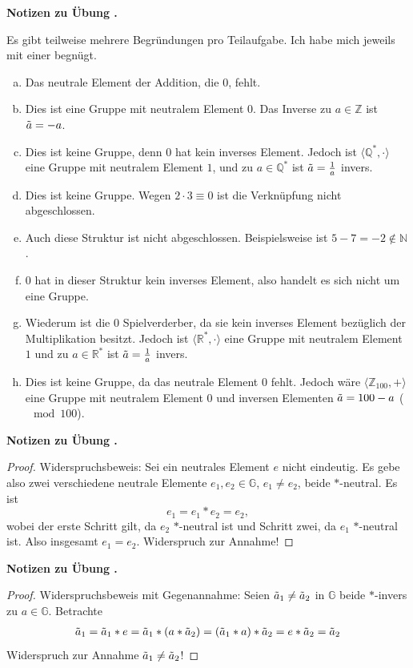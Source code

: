 \documentclass[%
11pt,%
twoside,%
titlepage,%
swissgerman,%
headsepline%
]{scrartcl}
\newcommand{\faReturnGray}{\textcolor{gray}{\faMailReply}} %
\theoremstyle{definition}
\theoremstyle{plain}
\newcommand{\concatueb}[1]{ueb:#1}%
\newcommand{\concatlsg}[1]{lsg:#1}%
\newcounter{uebcounter}[section]
\renewcommand{\theuebcounter}{\thesection.\arabic{uebcounter}}  %
\newenvironment{lsg}[1]{%
    \par\noindent\textbf{Notizen zu Übung \theuebcounter\label{\concatlsg{#1}}}
    \hfill\hyperref[\concatueb{#1}]{\faReturnGray}\par %
}{%
    \par%
}
\begin{document}
\begin{lsg}{gruppencheck}
    Es gibt teilweise mehrere Begründungen pro Teilaufgabe. Ich habe mich jeweils mit einer begnügt.
    \begin{enumerate}[a)]
        \item Das neutrale Element der Addition, die $0$, fehlt.
        \item Dies ist eine Gruppe mit neutralem Element $0$. Das Inverse zu $a\in\mathbb{Z}$ ist $\Tilde{a}=-a$.
        \item Dies ist keine Gruppe, denn $0$ hat kein inverses Element. Jedoch ist $\langle\mathbb{Q}^*,\cdot\rangle$ eine Gruppe mit neutralem Element $1$, und zu $a\in\mathbb{Q}^*$ ist $\Tilde{a}=\frac{1}{a}$ invers.
        \item Dies ist keine Gruppe. Wegen $2\cdot3\equiv0$ ist die Verknüpfung nicht abgeschlossen.
        \item Auch diese Struktur ist nicht abgeschlossen. Beispielsweise ist $5-7=-2\not\in\mathbb{N}$.
        \item $0$ hat in dieser Struktur kein inverses Element, also handelt es sich nicht um eine Gruppe.
        \item Wiederum ist die $0$ Spielverderber, da sie kein inverses Element bezüglich der Multiplikation besitzt. Jedoch ist $\langle\mathbb{R}^*,\cdot\rangle$ eine Gruppe mit neutralem Element $1$ und zu $a\in\mathbb{R}^*$ ist $\Tilde{a}=\frac{1}{a}$ invers.
        \item Dies ist keine Gruppe, da das neutrale Element $0$ fehlt. Jedoch wäre $\langle\mathbb{Z}_{100},+\rangle$ eine Gruppe mit neutralem Element $0$ und inversen Elementen $\Tilde{a}=100-a$ ($\mod100$).
    \end{enumerate}
\end{lsg}
\begin{lsg}{neutrales}
    \begin{proof}
        Widerspruchsbeweis: Sei ein neutrales Element $e$ nicht eindeutig. Es gebe also zwei verschiedene neutrale Elemente $e_1,e_2\in\mathbb{G}$, $e_1\neq e_2$, beide $*$-neutral. Es ist
        $$e_1=e_1*e_2=e_2,$$
        wobei der erste Schritt gilt, da $e_2$ $*$-neutral ist und Schritt zwei, da $e_1$ $*$-neutral ist. Also insgesamt $e_1=e_2$. Widerspruch zur Annahme!
    \end{proof}
\end{lsg}
\begin{lsg}{inverses}
    \begin{proof}
        Widerspruchsbeweis mit Gegenannahme: Seien $\Tilde{a}_1\neq\Tilde{a}_2$ in $\mathbb{G}$ beide $*$-invers zu $a\in\mathbb{G}$. Betrachte
        \begin{align*}
            \Tilde{a}_1=\Tilde{a}_1*e=\Tilde{a}_1*(a*\Tilde{a}_2)=(\Tilde{a}_1*a)*\Tilde{a}_2=e*\Tilde{a}_2=\Tilde{a}_2
        \end{align*}
        Widerspruch zur Annahme $\Tilde{a}_1\neq\Tilde{a}_2$!
    \end{proof}
\end{lsg}
\end{document}
